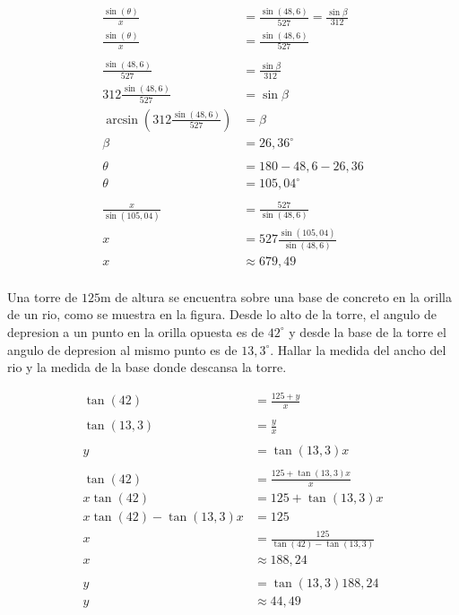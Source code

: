  {
    \[
        \begin{aligned}
            \frac{\sin(\theta)}{x} &= \frac{\sin(48,6)}{527} = \frac{\sin{\beta}}{312} \\
            \frac{\sin(\theta)}{x} &= \frac{\sin(48,6)}{527} \\
            \\
            \frac{\sin(48,6)}{527} &= \frac{\sin{\beta}}{312} \\
            312\frac{\sin(48,6)}{527} &= \sin{\beta} \\
            \arcsin(312\frac{\sin(48,6)}{527}) &= \beta \\
            \beta &= 26,36^\circ \\
            \\
            \theta &= 180 - 48,6 - 26,36 \\
            \theta &= 105,04^\circ \\
            \\
            \frac{x}{\sin(105,04)} &= \frac{527}{\sin(48,6)} \\
            x &= 527\frac{\sin(105,04)}{\sin(48,6)} \\
            x &\approx 679,49 \\
        \end{aligned}
    \]
}

 {
    Una torre de $125$m de altura se encuentra sobre una base de concreto en la 
    orilla de un rio, como se muestra en la figura. Desde lo alto de la torre, el 
    angulo de depresion a un punto en la orilla opuesta es de $42^\circ$ y desde la 
    base de la torre el angulo de depresion al mismo punto es de $13,3^\circ$. 
    Hallar la medida del ancho del rio y la medida de la base donde descansa la torre.
}

 {
    \[
        \begin{aligned}
            \tan(42) &= \frac{125+y}{x} \\
            \\
            \tan(13,3) &= \frac{y}{x} \\
            \\
            y &= \tan(13,3)x \\
            \\
            \tan(42) &= \frac{125+\tan(13,3)x}{x} \\
            x\tan(42) &= 125+\tan(13,3)x \\
            x\tan(42) - \tan(13,3)x &= 125 \\
            x &= \frac{125}{\tan(42) - \tan(13,3)} \\
            x &\approx 188,24 \\
            \\
            y &= \tan(13,3)188,24 \\
            y &\approx 44,49 \\
        \end{aligned}
    \]
}


